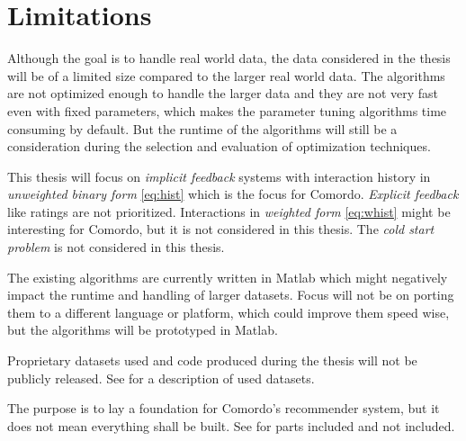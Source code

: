 
\section{Limitations}\label{sec:intro:limitations}

Although the goal is to handle real world data, the data considered in the thesis will be of a limited size compared to the larger real world data. The algorithms are not optimized enough to handle the larger data and they are not very fast even with fixed parameters, which makes the parameter tuning algorithms time consuming by default. But the runtime of the algorithms will still be a consideration during the selection and evaluation of optimization techniques.

This thesis will focus on \textit{implicit feedback} systems with interaction history in \textit{unweighted binary form} \eqref{eq:hist} which is the focus for Comordo. \textit{Explicit feedback} like ratings are not prioritized. Interactions in \textit{weighted form} \eqref{eq:whist} might be interesting for Comordo, but it is not considered in this thesis. The \textit{cold start problem} \citep{cacheda2011comparison} is not considered in this thesis.

The existing algorithms are currently written in Matlab which might negatively impact the runtime and handling of larger datasets. Focus will not be on porting them to a different language or platform, which could improve them speed wise, but the algorithms will be prototyped in Matlab.

Proprietary datasets used and code produced during the thesis will not be publicly released. See  for a description of used datasets.

The purpose is to lay a foundation for Comordo's recommender system, but it does not mean everything shall be built. See  for parts included and not included.

